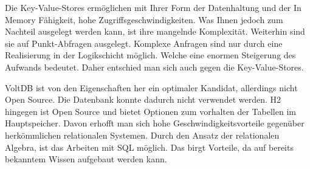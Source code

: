 Die Key-Value-Stores ermöglichen mit Ihrer Form der Datenhaltung und der In Memory Fähigkeit, hohe Zugriffsgeschwindigkeiten. Was Ihnen jedoch zum Nachteil ausgelegt werden kann, ist ihre mangelnde Komplexität. Weiterhin sind sie auf Punkt-Abfragen ausgelegt. Komplexe Anfragen sind nur durch eine Realisierung in der Logikschicht möglich. Welche eine enormen Steigerung des Aufwands bedeutet. Daher entschied man sich auch gegen die Key-Value-Stores. 

VoltDB ist von den Eigenschaften her ein optimaler Kandidat, allerdings nicht Open Source. Die Datenbank konnte dadurch nicht verwendet werden. H2 hingegen ist Open Source und bietet Optionen zum vorhalten der Tabellen im Hauptspeicher. Davon erhofft man sich hohe Geschwindigkeitsvorteile gegenüber herkömmlichen relationalen Systemen. Durch den Ansatz der relationalen Algebra, ist das Arbeiten mit SQL möglich. Das birgt Vorteile, da auf bereits bekanntem Wissen aufgebaut werden kann.